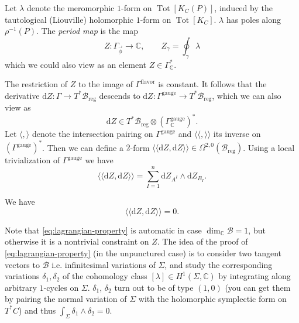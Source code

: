 \documentclass[12pt,letterpaper,reqno]{article}
\numberwithin{equation}{section}
\newcommand{\cB}{\ensuremath{\mathcal B}}
\newcommand{\C}{\ensuremath{\mathbb C}}
\newcommand{\de}{\mathrm{d}}
\newcommand{\reg}{\mathrm{reg}}
\newcommand{\gauge}{\mathrm{gauge}}
\newcommand{\flavor}{\mathrm{flavor}}
\newcommand{\IP}[1]{\langle#1\rangle}
\newcommand{\DIP}[1]{\langle\!\langle#1\rangle\!\rangle}
\newcommand{\vphi}{{\vec\phi}}
\newcommand{\ti}[1]{\textit{#1}}
\DeclareMathOperator{\rank}{rank}
\DeclareMathOperator{\Tot}{Tot}
\begin{document}
\begin{defn}
Let $\lambda$ denote the meromorphic $1$-form on $\Tot[K_C(P)]$,
induced by the tautological (Liouville) holomorphic $1$-form
on $\Tot[K_C]$.
$\lambda$ has poles along $\rho^{-1}(P)$.
The \ti{period map} is the map
\begin{equation}
   Z: \Gamma_\vphi \to \C, \qquad Z_\gamma = \oint_\gamma \lambda
\end{equation}
which we could also view as an element $Z \in \Gamma^*_\C$.
\end{defn}
The restriction of $Z$ to the image of $\Gamma^\flavor$ is constant. 
It follows that the derivative $\de Z: \Gamma \to T^* \cB_\reg$ descends to
$\de Z: \Gamma^\gauge \to T^* \cB_\reg$,
which we can also view as
\begin{equation}
  \de Z \in T^* \cB_\reg \otimes (\Gamma_\C^\gauge)^*.
\end{equation}
Let $\IP{,}$ denote the intersection pairing on $\Gamma^\gauge$
and $\DIP{,}$ its inverse on $(\Gamma^\gauge)^*$.
Then we can define a $2$-form
$\DIP{\de Z,  \de Z} \in \Omega^{2,0}(\cB_\reg)$.
Using a local trivialization of $\Gamma^\gauge$ we have
\begin{equation}
  \DIP{\de Z,  \de Z} = \sum_{I=1}^n \de Z_{A^I} \wedge \de Z_{B_I}.
\end{equation}


\begin{prop} We have
\begin{equation}  \label{eq:lagrangian-property}
\DIP{\de Z, \de Z} = 0.
\end{equation}
\end{prop}

Note that \eqref{eq:lagrangian-property} is automatic in case
$\dim_\C \cB = 1$, but otherwise it is a nontrivial
constraint on $Z$. The idea of the proof
of \eqref{eq:lagrangian-property} (in the unpunctured case)
is to consider two
tangent vectors to $\cB$ i.e. infinitesimal variations 
of $\Sigma$, and study the corresponding variations 
$\delta_1, \delta_2$ of 
the cohomology class $[\lambda] \in H^1(\Sigma,\C)$ 
by integrating along arbitrary
$1$-cycles on $\Sigma$. $\delta_1$, $\delta_2$ turn out to be
of type $(1,0)$
(you can get them by pairing the normal variation of $\Sigma$
with the holomorphic symplectic form on $T^* C$)
and thus
$\int_\Sigma \delta_1 \wedge \delta_2 = 0$.
\end{document}
